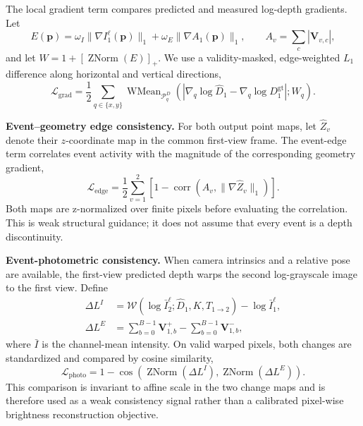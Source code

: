 The local gradient term compares predicted and measured log-depth gradients.
Let
\begin{equation}
E(\mathbf{p})
=\omega_I\|\nabla I_1^{\ell}(\mathbf{p})\|_1
+\omega_E\|\nabla A_1(\mathbf{p})\|_1,
\qquad
A_v=\sum_c|\mathbf{V}_{v,c}|,
\end{equation}
and let $W=1+[\operatorname{ZNorm}(E)]_+$.  We use a validity-masked,
edge-weighted $L_1$ difference along horizontal and vertical directions,
\begin{equation}
\mathcal{L}_{\mathrm{grad}}
=\frac{1}{2}
\sum_{q\in\{x,y\}}
\operatorname{WMean}_{\mathcal{P}^{D}_{q}}
\left(
\left|
\nabla_q\log\hat D_1-
\nabla_q\log D_1^{\mathrm{gt}}
\right|;W_q
\right).
\label{eq:depth_gradient_loss}
\end{equation}

\vspace{+5pt}
\noindent\textbf{Event--geometry edge consistency.}
For both output point maps, let $\hat Z_v$ denote their $z$-coordinate map in
the common first-view frame.  The event-edge term correlates event activity
with the magnitude of the corresponding geometry gradient,
\begin{equation}
\mathcal{L}_{\mathrm{edge}}
=\frac{1}{2}\sum_{v=1}^{2}
\left[
1-\operatorname{corr}\!\left(
A_v,\|\nabla\hat Z_v\|_1
\right)
\right].
\label{eq:event_edge_loss}
\end{equation}
Both maps are z-normalized over finite pixels before evaluating the
correlation.  This is weak structural guidance; it does not assume that every
event is a depth discontinuity.

\vspace{+5pt}
\noindent\textbf{Event-photometric consistency.}
When camera intrinsics and a relative pose are available, the first-view
predicted depth warps the second log-grayscale image to the first view.  Define
\begin{align}
\Delta L^{I}
&=\mathcal{W}(\log \bar I_2^{\ell};\hat D_1,K,T_{1\rightarrow2})
-\log \bar I_1^{\ell}, \\
\Delta L^{E}
&=\sum_{b=0}^{B-1}\mathbf{V}^{+}_{1,b}
-\sum_{b=0}^{B-1}\mathbf{V}^{-}_{1,b},
\end{align}
where $\bar I$ is the channel-mean intensity.  On valid warped pixels, both
changes are standardized and compared by cosine similarity,
\begin{equation}
\mathcal{L}_{\mathrm{photo}}
=1-\operatorname{cos}\!\left(
\operatorname{ZNorm}(\Delta L^{I}),
\operatorname{ZNorm}(\Delta L^{E})
\right).
\label{eq:event_photometric_loss}
\end{equation}
This comparison is invariant to affine scale in the two change maps and is
therefore used as a weak consistency signal rather than a calibrated
pixel-wise brightness reconstruction objective.

